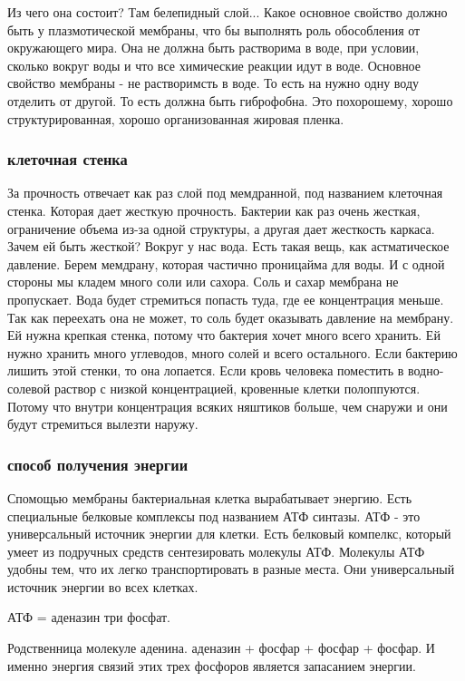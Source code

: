 Из чего она состоит? Там белепидный слой... Какое основное
свойство должно быть у плазмотической мембраны, что бы выполнять роль обособления
от окружающего мира. Она не должна быть растворима в воде,
при условии, сколько вокруг воды и что все химические реакции идут в воде. Основное
свойство мембраны - не растворимсть в воде. То есть на нужно одну воду отделить от другой.
То есть должна быть гиброфобна. Это похорошему, хорошо структурированная, хорошо 
организованная жировая пленка. 

\subsubsection{клеточная стенка}
За прочность отвечает как раз слой под мемдранной, под названием клеточная стенка. Которая 
дает жесткую прочность. Бактерии как раз очень жесткая, ограничение объема из-за 
одной структуры, а другая дает жесткость каркаса. Зачем ей быть жесткой? Вокруг у нас
вода. Есть такая вещь, как астматическое давление. Берем мемдрану, которая 
частично проницайма для воды. И с одной стороны мы кладем много соли или 
сахора. Соль и сахар мембрана не пропускает. Вода будет стремиться попасть туда, 
где ее концентрация меньше. Так как переехать она не может, 
то соль будет оказывать давление на мембрану. Ей нужна крепкая стенка, 
потому что бактерия хочет много всего хранить. Ей нужно хранить много углеводов, 
много солей и всего остального. Если бактерию лишить этой стенки, то она лопается. 
Если кровь человека поместить в водно-солевой раствор с низкой концентрацией, кровенные 
клетки полоппуются. Потому что внутри концентрация всяких няштиков больше, чем снаружи и
они будут стремиться вылезти наружу. 

\subsubsection{способ получения энергии}
Спомощью мембраны бактериальная клетка вырабатывает энергию. Есть
специальные белковые комплексы под названием АТФ синтазы. АТФ - это
универсальный источник энергии для клетки. Есть белковый компелкс,
который умеет из подручных средств сентезировать молекулы АТФ.
Молекулы АТФ удобны тем, что их легко транспортировать в разные места.
Они универсальный источник энергии во всех клетках.

АТФ = аденазин три фосфат.

Родственница молекуле аденина. аденазин + фосфар + фосфар + фосфар. И именно
энергия связий этих трех фосфоров является запасанием энергии.

